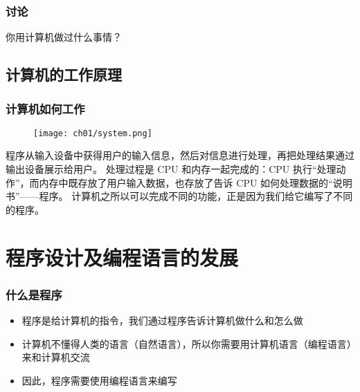 \begin{frame}[fragile]
    \frametitle{讨论}

    \begin{block}{}
        \vspace{.5cm}
        \begin{center}
            {\Large 你用计算机做过什么事情？}
        \end{center}
        \vspace{.5cm}
    \end{block}
\end{frame}

\subsection{计算机的工作原理}

\begin{frame}[fragile]
    \frametitle{计算机如何工作}

    \begin{figure}
        \texttt{[image: ch01/system.png]}
    \end{figure}

    \begin{overlayarea}{\textwidth}{.2\textheight}
         {程序从输入设备中获得用户的输入信息，然后对信息进行处理，再把处理结果通过输出设备展示给用户。}
         {处理过程是 CPU 和内存一起完成的：CPU 执行“处理动作”，而内存中既存放了用户输入数据，也存放了告诉 CPU 如何处理数据的“说明书”——程序。}
         {计算机之所以可以完成不同的功能，正是因为我们给它编写了不同的程序。}
    \end{overlayarea}
\end{frame}


\section{程序设计及编程语言的发展}

\begin{frame}[fragile]
    \frametitle{什么是程序}

    \begin{itemize}[<+->]
        \item 程序是给计算机的指令，我们通过程序告诉计算机做什么和怎么做
        \item 计算机不懂得人类的语言（自然语言），所以你需要用计算机语言（编程语言）来和计算机交流
        \item 因此，程序需要使用编程语言来编写
    \end{itemize}
\end{frame}

